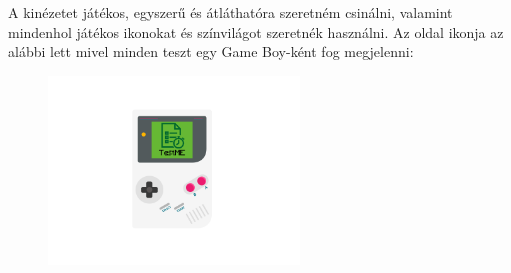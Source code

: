 









A kinézetet játékos, egyszerű és átláthatóra szeretném csinálni, valamint mindenhol játékos ikonokat és színvilágot szeretnék használni. Az oldal ikonja az alábbi lett mivel minden teszt egy Game Boy-ként fog megjelenni:

\begin{figure}[h]
    \centering
    \includegraphics[height=5cm]{images/gameboy.png}
\end{figure}


